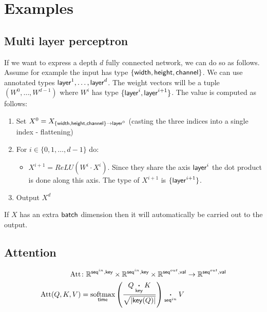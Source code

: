\documentclass{article}
\begin{document}
\section{Examples}
\label{sec:examples}

\subsection{Multi layer perceptron}

If we want to express a depth $d$ fully connected network, we can do so as follows.
Assume for example the input has type $\{ \name{width}, \name{height} , \name{channel} \}$.
We can use annotated types $\name{layer}^1,\ldots,\name{layer}^d$. 
The weight vectors will be a tuple $(W^0,\ldots,W^{d-1})$ where $W^i$ has type $\{ \name{layer}^{i},\name{layer}^{i+1} \}$.
The value is computed as follows:

\begin{enumerate}

\item Set $X^0 = X_{\{ \name{width}, \name{height} , \name{channel} \} \rightarrow \name{layer}^0 }$ (casting the three indices into a single index - flattening)

\item For $i \in \{0,1,\ldots, d-1\}$ do:


\begin{itemize}
    \item $X^{i+1} = ReLU(W^i \cdot X^i)$. Since they share the axis $\name{layer}^i$ the dot product is done along this axis. The type of $X^{i+1}$ is $\{ \name{layer}^{i+1} \}$.
\end{itemize}

\item Output $X^d$
\end{enumerate}

If $X$ has an extra $\name{batch}$ dimension then it will automatically be carried out to the output.



\subsection{Attention}


\begin{align*}
  \text{Att} &\colon \mathbb{R}^{\name{seq}^{in},\name{key}} \times \mathbb{R}^{\name{seq}^{in},\name{key}} \times \mathbb{R}^{\name{seq}^{out},\name{val}} \rightarrow \mathbb{R}^{\name{seq}^{out},\name{val}} \\
  \text{Att}(Q,K,V) &= \nfun{time}{softmax} \left( \frac{Q \ndot{key} K}{\sqrt{|\name{key}(Q)|}} \right) \nadot{\name{seq}^{in}} V
\end{align*}
\end{document}
